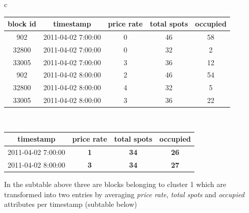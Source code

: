 \begin{table}
	{\begin{tabular}{ c }
		\begin{tabular}{ | c | c | c | c | c |}
			\hline
			\textbf{block id} & \textbf{timestamp} & \textbf{price rate} & \textbf{total spots} & \textbf{occupied} \\ \hline
			902   & {2011-04-02 7:00:00} & 0 & 46 & 58 \\ \hline
			32800 & {2011-04-02 7:00:00} & 0 & 32 & 2 \\ \hline
			33005 & {2011-04-02 7:00:00} & 3 & 36 & 12 \\ \hline
			902   & {2011-04-02 8:00:00} & 2 & 46 & 54 \\ \hline
			32800 & {2011-04-02 8:00:00} & 4 & 32 & 5 \\ \hline
			33005 & {2011-04-02 8:00:00} & 3 & 36 & 22 \\ \hline
		\end{tabular} \\
		\colrule
		\begin{tabular}{ | c | c | c | c |}
			\hline
			\textbf{timestamp} & \textbf{price rate} & \textbf{total spots} & \textbf{occupied} \\ \hline
			{2011-04-02 7:00:00} & \textbf{1} & \textbf{34} & \textbf{26} \\ \hline
			{2011-04-02 8:00:00} & \textbf{3} & \textbf{34} & \textbf{27} \\ \hline
		\end{tabular}
	\end{tabular}}
	\begin{tabnote}
		In the subtable above three are blocks belonging to cluster 1 which are transformed into two entries by averaging \textit{price rate}, \textit{total spots} and \textit{occupied} attributes per timestamp (subtable below)
	\end{tabnote}
	\label{extensions:aggregating_datapoints}
\end{table}
	
